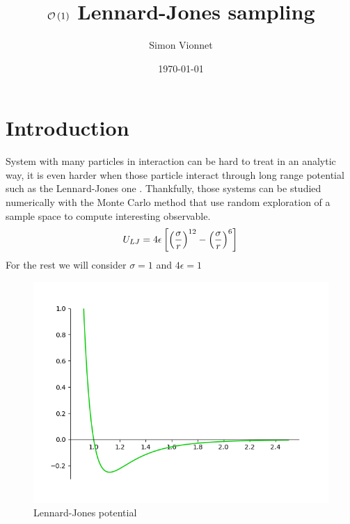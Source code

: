 \documentclass[jcp,twocolumn,longbibliography,superscriptaddress]{revtex4-2}
\begin{document}
	\title{$\mathcal{O}\left( 1 \right)$ Lennard-Jones sampling}
	\author{Simon Vionnet}
	\date{\today}
	\maketitle
	
	\section{Introduction}
	System with many particles in interaction can be hard to treat in an analytic way, it is even harder when those particle interact through long range potential such as the Lennard-Jones one . Thankfully, those systems can be studied numerically with the Monte Carlo method that use random exploration of a sample space to compute interesting observable.
	\begin{equation}
		\label{eq:LennardJones}
		U_{LJ} = 4\epsilon \left[ \left( \frac{\sigma}{r} \right)^{12} - \left( \frac{\sigma}{r} \right)^{6} \right]
	\end{equation}
	For the rest we will consider $\sigma = 1$ and $4\epsilon = 1$	
	\begin{figure}[htb]
		\centering
		\includegraphics[width=\columnwidth]{./Figures/LJ_plot.png}
		\caption{Lennard-Jones potential}
		\label{LennardJonesplot}
	\end{figure}
	
\end{document}
